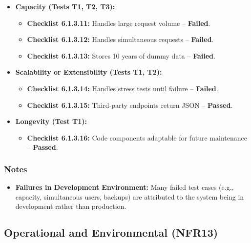 \documentclass[12pt, titlepage]{article}
\begin{document}
\begin{itemize}
    \item \textbf{Capacity (Tests T1, T2, T3):}  
    \begin{itemize}
        \item \textbf{Checklist 6.1.3.11:} Handles large request volume – \textbf{Failed}.  
        \item \textbf{Checklist 6.1.3.12:} Handles simultaneous requests – \textbf{Failed}.  
        \item \textbf{Checklist 6.1.3.13:} Stores 10 years of dummy data – \textbf{Failed}.  
    \end{itemize}
    
    \item \textbf{Scalability or Extensibility (Tests T1, T2):}  
    \begin{itemize}
        \item \textbf{Checklist 6.1.3.14:} Handles stress tests until failure – \textbf{Failed}.  
        \item \textbf{Checklist 6.1.3.15:} Third-party endpoints return JSON – \textbf{Passed}.  
    \end{itemize}
    
    \item \textbf{Longevity (Test T1):}  
    \begin{itemize}
        \item \textbf{Checklist 6.1.3.16:} Code components adaptable for future maintenance – \textbf{Passed}.  
    \end{itemize}
\end{itemize}

\subsubsection*{Notes}  
\begin{itemize}
    \item \textbf{Failures in Development Environment:} Many failed test cases (e.g., capacity, simultaneous users, backups) are attributed to the system being in development rather than production.
\end{itemize}

\subsection{Operational and Environmental (NFR13)}  
\label{nfr13}
\end{document}
